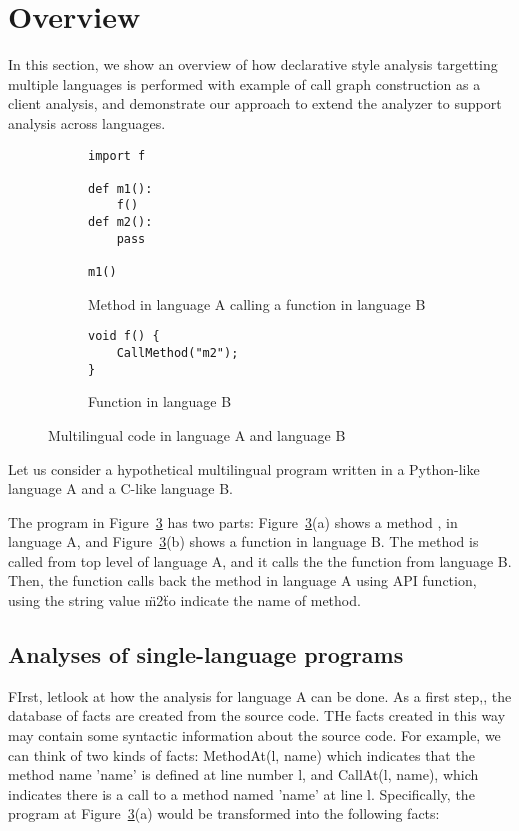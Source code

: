 \section{Overview}
In this section, we show an overview of how declarative style analysis
targetting multiple languages is performed with example of call graph
construction as a client analysis,
and demonstrate our approach to extend the analyzer to support analysis
across languages.

\begin{figure}[t]
  \centering
  \vspace{2mm}
  \begin{subfigure}[t]{0.5\textwidth}
    \begin{lstlisting}[style=java,xleftmargin=2.5em]
import f

def m1():
    f()
def m2():
    pass

m1()
    \end{lstlisting}
    \vspace*{-.5em}
    \caption{Method in language A calling a function in language B}
    \label{fig:exam:langA}
  \end{subfigure}
  \begin{subfigure}[t]{0.5\textwidth}
    \begin{lstlisting}[style=cpp,firstnumber=5,xleftmargin=2.5em]
void f() {
    CallMethod("m2");
}
    \end{lstlisting}
    \vspace*{-.5em}
    \caption{Function in language B}
    \label{fig:exam:langB}
  \end{subfigure}
  \vspace*{-.5em}
  \caption{Multilingual code in language A and language B}
  \label{fig:exam}
\end{figure}

Let us consider a hypothetical multilingual program written in a Python-like language A
and a C-like language B.

The program in Figure~\ref{fig:exam} has two parts: Figure~\ref{fig:exam}(a)
shows a method ,  in language A, and
Figure~\ref{fig:exam}(b) shows a function  in language B.  The method
 is called from top level of language A, and it calls the the function 
from language B.  Then, the function  calls back the method  in language A
using API function, using the string value \"m2\" to indicate the name of method.

\subsection{Analyses of single-language programs}
FIrst, let\s look at how the analysis for language A can be done.
As a first step,, the database of facts are created from the source code. THe
facts created in this way may contain some syntactic information about the
source code. For example, we can think of two kinds of facts: MethodAt(l, name) which
indicates that the method name 'name' is defined at line number l,
and CallAt(l, name), which indicates there is a call to a method named 'name' at line l.
Specifically, the program at Figure~\ref{fig:exam}(a) would be transformed into
the following facts:

